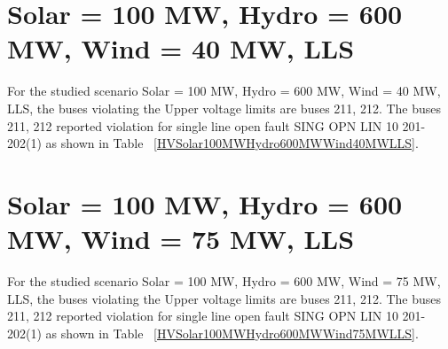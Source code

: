 \documentclass[10pt]{report}
\begin{document}
\section{Solar = 100 MW, Hydro = 600 MW, Wind = 40 MW, LLS}
For the studied scenario Solar = 100 MW, Hydro = 600 MW, Wind = 40 MW, LLS, the buses violating the Upper voltage limits are buses 211, 212.
The buses 211, 212 reported violation for single line open fault SING OPN LIN   10 201-202(1) as shown in Table ~\ref{HVSolar100MWHydro600MWWind40MWLLS}.
\begin{table}[H]
\caption{Contingencies reporting bus voltages greater than emergency voltage of 1.1 PU for scenario Solar = 100 MW, Hydro = 600 MW, Wind = 40 MW, LLS}
\label{HVSolar100MWHydro600MWWind40MWLLS}
\centering
{}
\end{table}


\section{Solar = 100 MW, Hydro = 600 MW, Wind = 75 MW, LLS}
For the studied scenario Solar = 100 MW, Hydro = 600 MW, Wind = 75 MW, LLS, the buses violating the Upper voltage limits are buses 211, 212.
The buses 211, 212 reported violation for single line open fault SING OPN LIN   10 201-202(1) as shown in Table ~\ref{HVSolar100MWHydro600MWWind75MWLLS}.
\begin{table}[H]
\caption{Contingencies reporting bus voltages greater than emergency voltage of 1.1 PU for scenario Solar = 100 MW, Hydro = 600 MW, Wind = 75 MW, LLS}
\label{HVSolar100MWHydro600MWWind75MWLLS}
\centering
{}
\end{table}
\end{document}
